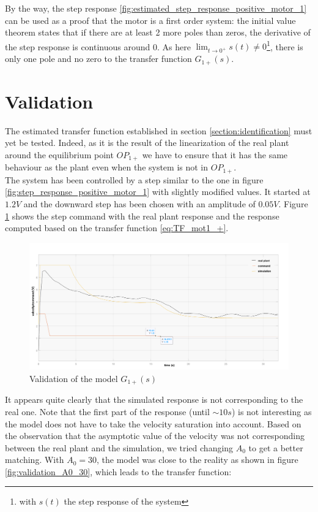 By the way, the step response \ref{fig:estimated_step_response_positive_motor_1} can be used as a proof that the motor
is a first order system: the initial value theorem states that if there are at least 2 more poles than zeros, the 
derivative of the step response is continuous around 0. As here $\lim_{t \rightarrow 0^+} s(t) \neq 0$\footnote{with $s
(t)$ the step response of the system}, there is only one pole and no zero to the transfer function $G_{1+}(s)$.

\section{Validation}
\label{section_validation}

The estimated transfer function established in section \ref{section:identification} must yet be tested. Indeed, as it
is the result of the linearization of the real plant around the equilibrium point $OP_{1+}$ we have to ensure that it
has the same behaviour as the plant even when the system is not in $OP_{1+}$.\\

The system has been controlled by a step similar to the one in figure \ref{fig:step_response_positive_motor_1} with slightly
modified values. It started at $1.2 V$ and the downward step has been chosen with an amplitude of $0.05 V$. Figure 
\ref{fig:validation_A0_24} shows the step command with the real plant response and the response computed based on the
transfer function \ref{eq:TF_mot1_+}.

\begin{figure}[H]
    \centering
    \includegraphics[width=\textwidth]{Pictures/validation_A0_24.png}
    \caption{Validation of the model $G_{1+} (s)$}
    \label{fig:validation_A0_24}
\end{figure}

It appears quite clearly that the simulated response is not corresponding to the real one. Note that the first part of
the response (until $\sim 10s$) is not interesting as the model does not have to take the velocity saturation into account.
Based on the observation that the asymptotic value of the velocity was not corresponding between the real plant and the
simulation, we tried changing $A_0$ to get a better matching. With $A_0 = 30$, the model was close to the reality as 
shown in figure \ref{fig:validation_A0_30}, which leads to the transfer function:

